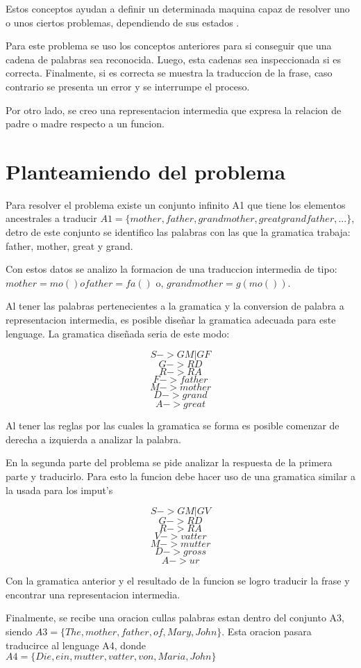 \documentclass[conference]{IEEEtran}
\begin{document}
Estos conceptos ayudan a definir un determinada maquina capaz de resolver uno o unos ciertos problemas, dependiendo de sus estados \cite{b2}.

Para este problema se uso los conceptos anteriores para si conseguir que una cadena de palabras sea reconocida. Luego, esta cadenas sea inspeccionada si es correcta. Finalmente, si es correcta se muestra la traduccion de la frase, caso contrario se presenta un error y se interrumpe el proceso.

Por otro lado, se creo una representacion intermedia que expresa la relacion de padre o madre respecto a un funcion.

\section{Planteamiendo del problema}

Para resolver el problema existe un conjunto infinito A1 que tiene los elementos ancestrales a traducir $A1 = \{mother, father, grandmother, greatgrandfather, ...\}$, 
detro de este conjunto se identifico las palabras con las que la gramatica trabaja: father, mother, great y grand.

Con estos datos se analizo la formacion de una traduccion intermedia de tipo:
$mother = mo() o father = fa()$ o,
$grandmother = g(mo())$. 

Al tener las palabras pertenecientes a la gramatica y la conversion de palabra a representacion intermedia, es posible diseñar la gramatica adecuada para este lenguage. La gramatica diseñada seria de este modo:

$$S-> G M | G F  $$
$$G-> R D $$
$$R-> R A $$
$$F-> father$$
$$M-> mother$$
$$D-> grand$$
$$A-> great$$

Al tener las reglas por las cuales la gramatica se forma es posible comenzar de derecha a izquierda a analizar la palabra.

En la segunda parte del problema se pide analizar la respuesta de la primera parte y traducirlo. Para esto la funcion debe hacer uso de una gramatica similar a la usada para los imput's

$$S-> G M | G V  $$
$$G-> R D $$
$$R-> R A $$
$$V-> vatter$$
$$M-> mutter$$
$$D-> gross$$
$$A-> ur$$

Con la gramatica anterior y el resultado de la funcion se logro traducir la frase y encontrar una representacion intermedia.

Finalmente, se recibe una oracion cullas palabras estan dentro del conjunto A3, siendo $A3 = \{The, mother, father, of, Mary, John \}$. Esta oracion pasara traducirce al lenguage A4, donde $A4 = \{Die, ein, mutter, vatter, von, Maria, John \}$
\end{document}
